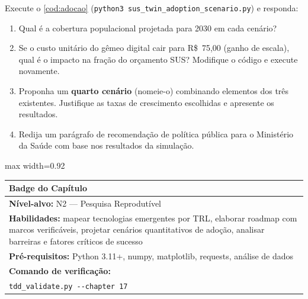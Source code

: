 \begin{exercicio}
    \label{ex:sus}
    Execute o \autoref{cod:adocao} (\texttt{python3
    sus\_twin\_adoption\_scenario.py}) e responda:

    \begin{enumerate}
        \item Qual é a cobertura populacional projetada para 2030
            em cada cenário?
        \item Se o custo unitário do gêmeo digital cair para
            R\$~75,00 (ganho de escala), qual é o impacto na
            fração do orçamento SUS? Modifique o código e
            execute novamente.
        \item Proponha um \textbf{quarto cenário} (nomeie-o)
            combinando elementos dos três existentes. Justifique
            as taxas de crescimento escolhidas e apresente os
            resultados.
        \item Redija um parágrafo de recomendação de política
            pública para o Ministério da Saúde com base nos
            resultados da simulação.
    \end{enumerate}
\end{exercicio}


\vfill

\begin{center}
\begin{adjustbox}{max width=0.92\textwidth}
\begin{tabular}{|p{12cm}|}
\hline
\rowcolor{bgalt}
\textbf{Badge do Capítulo} \\
\hline
\rowcolor{bgalt}
\textbf{Nível-alvo:} N2 --- Pesquisa Reprodutível \\
\textbf{Habilidades:} mapear tecnologias emergentes por TRL,
elaborar roadmap com marcos verificáveis, projetar cenários
quantitativos de adoção, analisar barreiras e fatores críticos
de sucesso \\
\textbf{Pré-requisitos:} Python 3.11+, numpy, matplotlib,
requests, análise de dados \\
\textbf{Comando de verificação:} \\
\verb|tdd_validate.py --chapter 17| \\
\hline
\end{tabular}
\end{adjustbox}
\end{center}

\vfill
